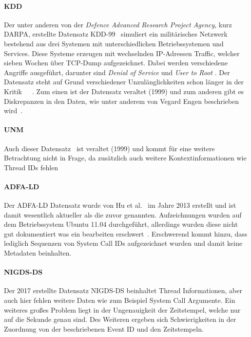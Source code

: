         \paragraph{KDD}
            Der unter anderen von der \textit{Defence Advanced Research Project Agency}, kurz DARPA, erstellte Datensatz KDD-99~\cite{DARPA}
            simuliert ein militärisches Netzwerk bestehend aus drei Systemen mit unterschiedlichen Betriebssystemen und Services. 
            Diese Systeme erzeugen mit wechselnden IP-Adressen Traffic, welcher sieben Wochen über TCP-Dump aufgezeichnet.
            Dabei werden verschiedene Angriffe ausgeführt, darunter sind \textit{Denial of Service} und \textit{User to Root} .
            Der Datensatz steht auf Grund verschiedener Unzulänglichkeiten schon länger in der Kritik~\cite{KDD}~\cite{KDD2}~\cite{UNM}.  Zum einen ist der Datensatz veraltet (1999) und zum anderen gibt es Diskrepanzen in den Daten, wie unter anderem von Vegard Engen beschrieben wird~\cite{KDD}.
        \paragraph{UNM}
            Auch dieser Datensatz~\cite{UNM} ist veraltet (1999) und kommt für eine weitere Betrachtung nicht in Frage,
            da zusätzlich auch weitere Kontextinformationen wie Thread IDs fehlen~\cite{UNMcritic}
        \paragraph{ADFA-LD}
            Der ADFA-LD Datensatz wurde von Hu et al.~\cite{UNMcritic} im Jahre 2013 erstellt und ist damit wesentlich aktueller als die zuvor genannten.
            Aufzeichnungen wurden auf dem Betriebssystem Ubuntu 11.04 durchgeführt, allerdings wurden diese nicht gut dokumentiert was ein bearbeiten erschwert~\cite{ADFA-LDcritic}.
            Erschwerend kommt hinzu, dass lediglich Sequenzen von System Call IDs aufgezeichnet wurden und damit keine Metadaten beinhalten.
        \paragraph{NIGDS-DS}
            Der 2017 erstellte Datensatz NIGDS-DS beinhaltet Thread Informationen, aber auch hier fehlen weitere Daten wie zum Beispiel System Call Argumente.
            Ein weiteres großes Problem liegt in der Ungenauigkeit der Zeitstempel, welche nur auf die Sekunde genau sind.
            Des Weiteren ergeben sich Schwierigkeiten in der Zuordnung von der beschriebenen Event ID und den Zeitstempeln.

